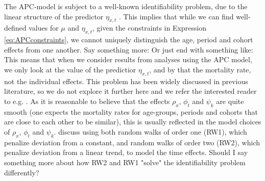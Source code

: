 \newpar The APC-model is subject to a well-known identifiability problem, due to the linear structure of the predictor $\eta_{x,t}$ \parencite{RieblerThesis2010}. This implies that while we can find well-defined values for $\mu$ and $\eta_{x,t}$, given the constraints in Expression \ref{eq:APCconstraints}, we cannot uniquely distinguish the age, period and cohort effects from one another. 
\textcolor{myDarkGreen}{Say something more: Or just end with something like: This means that when we consider results from analyses using the APC model, we only look at the value of the predictior $\eta_{x,t}$, and by that the mortality rate, not the individual effects.} This problem has been widely discussed in previous literature, so we do not explore it further here and we refer the interested reader to e.g. \textcite{RieblerThesis2010}. 
\newpar As it is reasonable to believe that the effects $\rho_x$, $\phi_t$ and $\psi_k$ are quite smooth (one expects the mortality rates for age-groups, periods and cohorts that are close to each other to be similar), this is usually reflected in the model choices of $\rho_x$, $\phi_t$ and $\psi_k$. \textcite{RieblerThesis2010} discuss using both random walks of order one (RW1), which penalize deviation from a constant, and random walks of order two (RW2), which penalize deviation from a linear trend, to model the time effects. 
\textcolor{myDarkGreen}{Should I say something more about how RW2 and RW1 "solve" the identifiability problem differently? }



